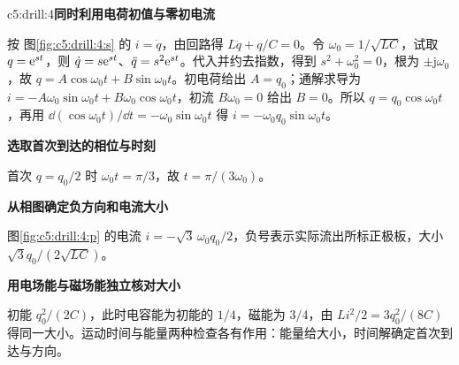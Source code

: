 \begin{drillsolution}{c5:drill:4}\textbf{同时利用电荷初值与零初电流}\par\nobreak
按 图\ref{fig:c5:drill:4:s} 的 $i=\dot q$，由回路得 $L\ddot q+q/C=0$。令 $\omega_0=1/\sqrt{LC}$，试取 $q=\mathrm e^{st}$，则 $\dot q=s\mathrm e^{st}$、$\ddot q=s^2\mathrm e^{st}$。代入并约去指数，得到 $s^2+\omega_0^2=0$，根为 $\pm\mathrm j\omega_0$，故 $q=A\cos\omega_0t+B\sin\omega_0t$。初电荷给出 $A=q_0$；通解求导为 $i=-A\omega_0\sin\omega_0t+B\omega_0\cos\omega_0t$，初流 $B\omega_0=0$ 给出 $B=0$。所以 $q=q_0\cos\omega_0t$，再用 $\dd(\cos\omega_0t)/\dd t=-\omega_0\sin\omega_0t$ 得 $i=-\omega_0q_0\sin\omega_0t$。

\par\medskip{}\noindent\textbf{选取首次到达的相位与时刻}\par\nobreak
首次 $q=q_0/2$ 时 $\omega_0t=\pi/3$，故 $t=\pi/(3\omega_0)$。



\par\medskip{}\noindent\textbf{从相图确定负方向和电流大小}\par\nobreak
图\ref{fig:c5:drill:4:p} 的电流 $i=-\sqrt3\,\omega_0q_0/2$，负号表示实际流出所标正极板，大小 $\sqrt3q_0/(2\sqrt{LC})$。

\par\medskip{}\noindent\textbf{用电场能与磁场能独立核对大小}\par\nobreak
初能 $q_0^2/(2C)$，此时电容能为初能的 $1/4$，磁能为 $3/4$，由 $Li^2/2=3q_0^2/(8C)$ 得同一大小。运动时间与能量两种检查各有作用：能量给大小，时间解确定首次到达与方向。\end{drillsolution}
